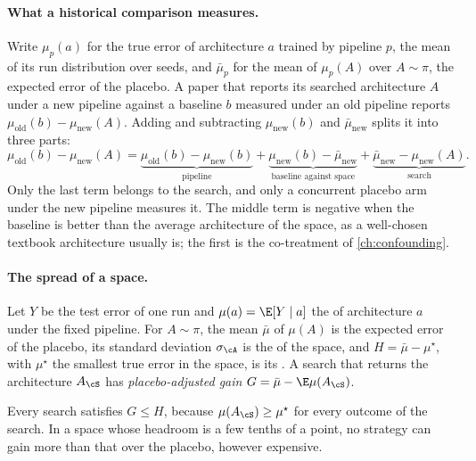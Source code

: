 \begin{refsection}
\paragraph{What a historical comparison measures.} Write $\mu_p(a)$ for the true error of architecture $a$ trained by pipeline $p$, the mean of its run distribution over seeds, and $\bar\mu_p$ for the mean of $\mu_p(A)$ over $A\sim\pi$, the expected error of the placebo. A paper that reports its searched architecture $A$ under a new pipeline against a baseline $b$ measured under an old pipeline reports $\mu_{\mathrm{old}}(b)-\mu_{\mathrm{new}}(A)$. Adding and subtracting $\mu_{\mathrm{new}}(b)$ and $\bar\mu_{\mathrm{new}}$ splits it into three parts:
\begin{equation}\label{eq:controls:decomp}
\mu_{\mathrm{old}}(b)-\mu_{\mathrm{new}}(A)=\underbrace{\mu_{\mathrm{old}}(b)-\mu_{\mathrm{new}}(b)}_{\text{pipeline}}+\underbrace{\mu_{\mathrm{new}}(b)-\bar\mu_{\mathrm{new}}}_{\text{baseline against space}}+\underbrace{\bar\mu_{\mathrm{new}}-\mu_{\mathrm{new}}(A)}_{\text{search}} .
\end{equation}
Only the last term belongs to the search, and only a concurrent placebo arm under the new pipeline measures it. The middle term is negative when the baseline is better than the average architecture of the space, as a well-chosen textbook architecture usually is; the first is the co-treatment of \cref{ch:confounding}.

\paragraph{The spread of a space.} Let $Y$ be the test error of one run and $\mu(a)=\E[Y\mid a]$ the  of architecture $a$ under the fixed pipeline. For $A\sim\pi$, the mean $\bar\mu$ of $\mu(A)$ is the expected error of the placebo, its standard deviation $\sigma_{\cA}$ is the  of the space, and $H=\bar\mu-\mu^\star$, with $\mu^\star$ the smallest true error in the space, is its . A search that returns the architecture $A_{\cS}$ has \emph{placebo-adjusted gain} $G=\bar\mu-\E\mu(A_{\cS})$.

\begin{remark}\label{rem:controls:headroom}
Every search satisfies $G\le H$, because $\mu(A_{\cS})\ge\mu^\star$ for every outcome of the search. In a space whose headroom is a few tenths of a point, no strategy can gain more than that over the placebo, however expensive.
\end{remark}


\end{refsection}
